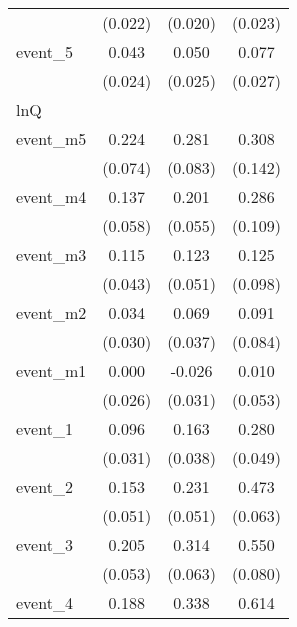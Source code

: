 {\begin{tabular}{l*{3}{c}}
            &     (0.022)         &     (0.020)         &     (0.023)         \\
[1em]
event\_5     &       0.043         &       0.050\sym{*}  &       0.077\sym{**} \\
            &     (0.024)         &     (0.025)         &     (0.027)         \\
\hline
lnQ         &                     &                     &                     \\
event\_m5    &       0.224\sym{**} &       0.281\sym{***}&       0.308\sym{*}  \\
            &     (0.074)         &     (0.083)         &     (0.142)         \\
[1em]
event\_m4    &       0.137\sym{*}  &       0.201\sym{***}&       0.286\sym{**} \\
            &     (0.058)         &     (0.055)         &     (0.109)         \\
[1em]
event\_m3    &       0.115\sym{**} &       0.123\sym{*}  &       0.125         \\
            &     (0.043)         &     (0.051)         &     (0.098)         \\
[1em]
event\_m2    &       0.034         &       0.069         &       0.091         \\
            &     (0.030)         &     (0.037)         &     (0.084)         \\
[1em]
event\_m1    &       0.000         &      -0.026         &       0.010         \\
            &     (0.026)         &     (0.031)         &     (0.053)         \\
[1em]
event\_1     &       0.096\sym{**} &       0.163\sym{***}&       0.280\sym{***}\\
            &     (0.031)         &     (0.038)         &     (0.049)         \\
[1em]
event\_2     &       0.153\sym{**} &       0.231\sym{***}&       0.473\sym{***}\\
            &     (0.051)         &     (0.051)         &     (0.063)         \\
[1em]
event\_3     &       0.205\sym{***}&       0.314\sym{***}&       0.550\sym{***}\\
            &     (0.053)         &     (0.063)         &     (0.080)         \\
[1em]
event\_4     &       0.188\sym{**} &       0.338\sym{***}&       0.614\sym{***}\\

\end{tabular}}
